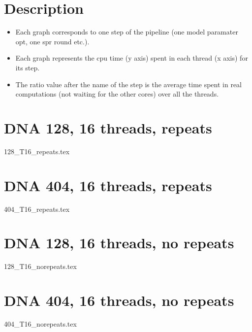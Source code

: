 \documentclass[12pt,a4paper]{article}
\begin{document}
\newcommand*{\figuretitle}[1]{%
    {\centering%
    \textbf{#1}%
    \par\medskip}%
}

\section{Description}
\begin{itemize}
\item Each graph  corresponds to one step of the pipeline (one model paramater opt, one spr round etc.).
\item Each graph represents the cpu time (y axis) spent in each thread (x axis) for its step.
\item The ratio value after the name of the step is the average time spent in real computations (not waiting for the other cores) over all the threads. 
\end{itemize}



\section{DNA 128, 16 threads,  repeats} 
{128_T16_repeats.tex}
\section{DNA 404, 16 threads,  repeats} 
{404_T16_repeats.tex}
\section{DNA 128, 16 threads, no repeats} 
{128_T16_norepeats.tex}
\section{DNA 404, 16 threads, no repeats} 
{404_T16_norepeats.tex}
\end{document}
